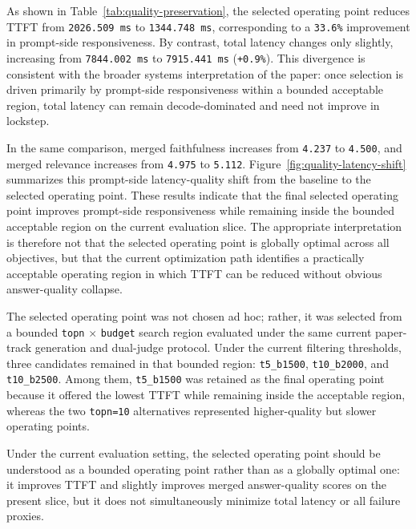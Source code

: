 \documentclass[10pt,twocolumn]{article}
\begin{document}


As shown in Table~\ref{tab:quality-preservation}, the selected operating point reduces TTFT from \texttt{2026.509 ms} to \texttt{1344.748 ms}, corresponding to a \texttt{33.6\%} improvement in prompt-side responsiveness. By contrast, total latency changes only slightly, increasing from \texttt{7844.002 ms} to \texttt{7915.441 ms} (\texttt{+0.9\%}). This divergence is consistent with the broader systems interpretation of the paper: once selection is driven primarily by prompt-side responsiveness within a bounded acceptable region, total latency can remain decode-dominated and need not improve in lockstep.

In the same comparison, merged faithfulness increases from \texttt{4.237} to \texttt{4.500}, and merged relevance increases from \texttt{4.975} to \texttt{5.112}. Figure~\ref{fig:quality-latency-shift} summarizes this prompt-side latency-quality shift from the baseline to the selected operating point. These results indicate that the final selected operating point improves prompt-side responsiveness while remaining inside the bounded acceptable region on the current evaluation slice. The appropriate interpretation is therefore not that the selected operating point is globally optimal across all objectives, but that the current optimization path identifies a practically acceptable operating region in which TTFT can be reduced without obvious answer-quality collapse.

The selected operating point was not chosen ad hoc; rather, it was selected from a bounded \texttt{topn} $\times$ \texttt{budget} search region evaluated under the same current paper-track generation and dual-judge protocol. Under the current filtering thresholds, three candidates remained in that bounded region: \texttt{t5\_b1500}, \texttt{t10\_b2000}, and \texttt{t10\_b2500}. Among them, \texttt{t5\_b1500} was retained as the final operating point because it offered the lowest TTFT while remaining inside the acceptable region, whereas the two \texttt{topn=10} alternatives represented higher-quality but slower operating points.

Under the current evaluation setting, the selected operating point should be understood as a bounded operating point rather than as a globally optimal one: it improves TTFT and slightly improves merged answer-quality scores on the present slice, but it does not simultaneously minimize total latency or all failure proxies.
\end{document}

